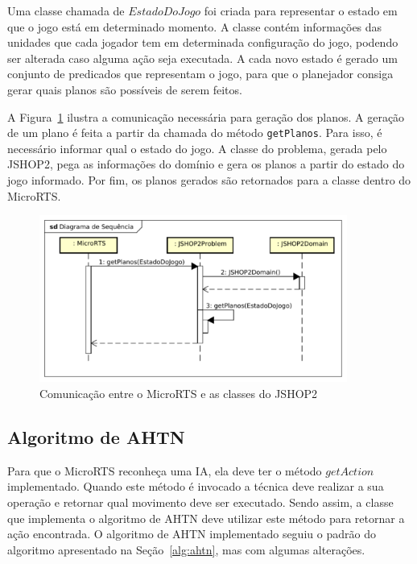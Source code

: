 Uma classe chamada de $EstadoDoJogo$ foi criada para representar o estado em que o jogo está em determinado momento.
A classe contém informações das unidades que cada jogador tem em determinada configuração do jogo, podendo ser alterada caso alguma ação seja executada.
A cada novo estado é gerado um conjunto de predicados que representam o jogo, para que o planejador consiga gerar quais planos são possíveis de serem feitos.

A Figura~\ref{fig:planos} ilustra a comunicação necessária para geração dos planos.
A geração de um plano é feita a partir da chamada do método \texttt{getPlanos}.
Para isso, é necessário informar qual o estado do jogo.
A classe do problema, gerada pelo JSHOP2, pega as informações do domínio e gera os planos a partir do estado do jogo informado.
Por fim, os planos gerados são retornados para a classe dentro do MicroRTS.

\begin{figure}[ht]
	\centering
	\includegraphics[width=0.9\textwidth]{fig/gerarPlano.pdf}
	\caption{Comunicação entre o MicroRTS e as classes do JSHOP2}
	\label{fig:planos}
\end{figure}

\subsection{Algoritmo de AHTN}

Para que o MicroRTS reconheça uma IA, ela deve ter o método $\mathit{getAction}$ implementado.
Quando este método é invocado a técnica deve realizar a sua operação e retornar qual movimento deve ser executado.
Sendo assim, a classe que implementa o algoritmo de AHTN deve utilizar este método para retornar a ação encontrada.
O algoritmo de AHTN implementado seguiu o padrão do algoritmo apresentado na Seção~\ref{alg:ahtn}, mas com algumas alterações.

